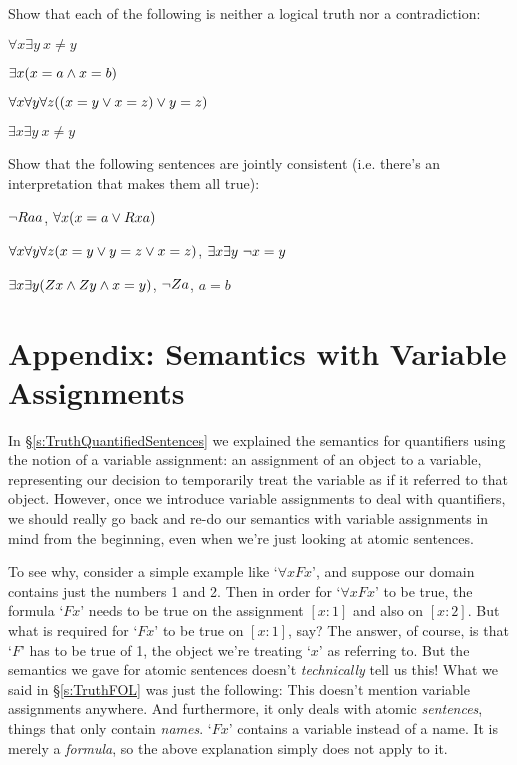 \problempart
\label{pr.Contingent}
Show that each of the following is neither a logical truth nor a contradiction:
\begin{earg}
\item $\forall x \exists y \ x \neq y$
\item $\exists x (x = a \wedge x = b)$
\item $\forall x \forall y \forall z((x = y \vee x = z) \vee y = z)$
\item $\exists x \exists y \ x \neq y$
\end{earg}
Show that the following sentences are jointly consistent (i.e. there's an interpretation that makes them all true):
\begin{earg}
\setcounter{eargnum}{4}
\item $\neg Raa$, $\forall x (x=a \vee Rxa)$
\item $\forall x\forall y\forall z(x=y \vee y=z \vee x=z)$, $\exists x\exists y\ \neg x= y$
\item $\exists x\exists y(Zx \wedge Zy \wedge x=y)$, $\neg Za$, $a=b$
\end{earg}







\section{Appendix: Semantics with Variable Assignments}\label{s:semanticsappendix}

In \S\ref{s:TruthQuantifiedSentences} we explained the semantics for quantifiers using the notion of a variable assignment: an assignment of an object to a variable, representing our decision to temporarily treat the variable as if it referred to that object.  However, once we introduce variable assignments to deal with quantifiers, we should really go back and re-do our semantics with variable assignments in mind from the beginning, even when we're just looking at atomic sentences.


To see why, consider a simple example like `$\forall xFx$', and suppose our domain contains just the numbers 1 and 2.  Then in order for `$\forall xFx$' to be true, the formula `$Fx$' needs to be true on the assignment $[x:1]$ and also on $[x:2]$.  But what is required for `$Fx$' to be true on $[x:1]$, say?  The answer, of course, is that `$F$' has to be true of 1, the object we're treating `$x$' as referring to.  But the semantics we gave for atomic sentences doesn't \emph{technically} tell us this!  What we said in \S\ref{s:TruthFOL} was just the following:
This doesn't mention variable assignments anywhere.  And furthermore, it only deals with atomic \emph{sentences}, things that only contain \emph{names}.  `$Fx$'  contains a variable instead of a name.  It is merely a \emph{formula}, so the above explanation simply does not apply to it.

